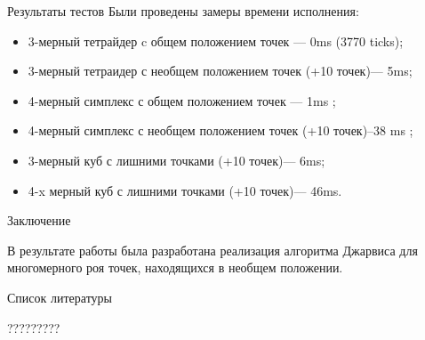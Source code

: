 \documentclass[]{beamer} %
\begin{document}
\begin{frame}{Результаты тестов}
    Были проведены замеры времени исполнения:
    \begin{itemize}
        \item 3-мерный тетрайдер c общем положением точек --- 0ms (3770 ticks);
        \item 3-мерный тетраидер с необщем положением точек (+10 точек)--- 5ms;
        \item 4-мерный симплекс с общем положением точек --- 1ms ;
        \item 4-мерный симплекс с необщем положением точек (+10 точек)--38 ms ;
        \item 3-мерный куб с лишними точками  (+10 точек)--- 6ms;
        \item 4-x мерный куб с лишними точками  (+10 точек)--- 46ms.
    \end{itemize}
\end{frame}

\begin{frame}{Заключение}

    В результате работы была разработана реализация алгоритма Джарвиса  для многомерного роя точек, находящихся в необщем положении.
\end{frame}

\begin{frame}
\end{frame}

\begin{frame}{Список литературы}
    \begin{thebibliography}{}
          ?????????
    \end{thebibliography}
\end{frame}
\end{document}

